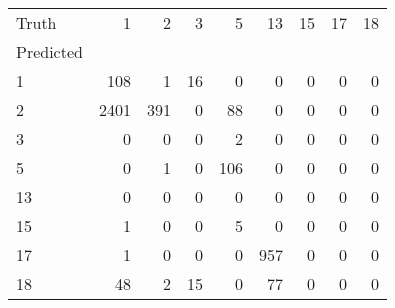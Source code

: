 \begin{tabular}{lrrrrrrrr}
\toprule
Truth & 1 & 2 & 3 & 5 & 13 & 15 & 17 & 18 \\
Predicted &  &  &  &  &  &  &  &  \\
\midrule
1 & 108 & 1 & 16 & 0 & 0 & 0 & 0 & 0 \\
2 & 2401 & 391 & 0 & 88 & 0 & 0 & 0 & 0 \\
3 & 0 & 0 & 0 & 2 & 0 & 0 & 0 & 0 \\
5 & 0 & 1 & 0 & 106 & 0 & 0 & 0 & 0 \\
13 & 0 & 0 & 0 & 0 & 0 & 0 & 0 & 0 \\
15 & 1 & 0 & 0 & 5 & 0 & 0 & 0 & 0 \\
17 & 1 & 0 & 0 & 0 & 957 & 0 & 0 & 0 \\
18 & 48 & 2 & 15 & 0 & 77 & 0 & 0 & 0 \\
\bottomrule
\end{tabular}
